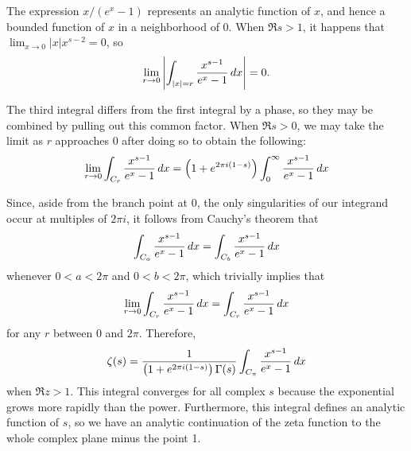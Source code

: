 \documentclass[12pt]{article}
\begin{document}
The expression $x / (e^x - 1)$ represents an analytic function of
$x$, and hence a bounded function of $x$ in a neighborhood of $0$.
When $\Re s > 1$, it happens that $\lim_{x \to 0} |x| x^{s-2} = 0$, so
\[
\lim_{r \to 0} \left| \int_{|x| = r}
{x^{s-1} \over e^x - 1} \, dx \right| = 0.
\]

The third integral differs from the first integral by a phase, so
they may be combined by pulling out this common factor.  When 
$\Re s > 0$, we may take the limit as $r$ approaches $0$ after doing
so to obtain the following:
\[
\lim_{r \to 0}
\int_{C_r}
{x^{s-1} \over e^x - 1} \, dx =
\left( 1 + e^{2 \pi i (1 - s)} \right)
\int_0^\infty 
{x^{s-1} \over e^x - 1} \, dx
\]

Since, aside from the branch point at
$0$, the only singularities of our integrand occur at multiples
of $2 \pi i$, it follows from Cauchy's theorem that
\[
\int_{C_a} 
{x^{s-1} \over e^x - 1} \, dx =
\int_{C_b} 
{x^{s-1} \over e^x - 1} \, dx
\]
whenever $0 < a < 2 \pi$ and $0 < b < 2 \pi$, which trivially implies that
\[
\lim_{r \to 0}
\int_{C_r}
{x^{s-1} \over e^x - 1} \, dx =
\int_{C_r}
{x^{s-1} \over e^x - 1} \, dx
\]
for any $r$ between $0$ and $2 \pi$.  Therefore,
\[
\zeta (s) = 
{1 \over \left( 1 + e^{2 \pi i (1 - s)} \right) \Gamma(s)}
\int_{C_\pi} {x^{s-1} \over e^x - 1} \, dx
\]
when $\Re z > 1$.  This integral converges for all complex $s$ because
the exponential grows more rapidly than the power.  Furthermore, this
integral defines an analytic function of $s$, so we have an analytic
continuation of the zeta function to the whole complex plane minus the point 1.


\end{document}
